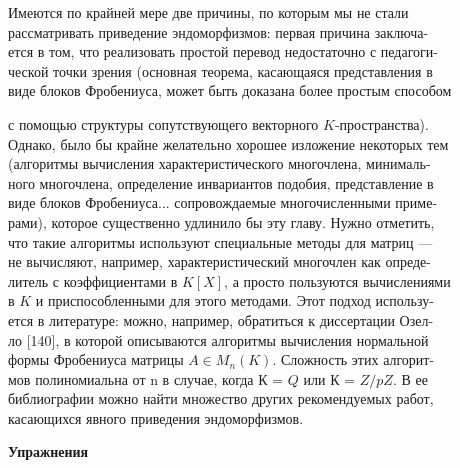 \medskip

Имеются по крайней мере две причины, по которым мы не стали\\ 
рассматривать приведение эндоморфизмов: первая причина 
заключа-\\ется в том, что реализовать простой перевод недостаточно с 
педагоги-\\ческой точки зрения (основная теорема, касающаяся представления в\\ виде блоков Фробениуса, может быть доказана более простым способом

\pagebreak

\noindent с помощью структуры сопутствующего векторного $K$-пространства).\\ 
Однако, было бы крайне желательно хорошее изложение некоторых тем\\ 
(алгоритмы вычисления характеристического многочлена, 
минималь-\\ного многочлена, определение инвариантов подобия, представление в\\ виде блоков Фробениуса... сопровождаемые многочисленными 
приме-\\рами), которое существенно удлинило бы эту главу. Нужно отметить,\\ 
что такие алгоритмы используют специальные методы для матриц —\\ 
не вычисляют, например, характеристический многочлен как 
опреде-\\литель с коэффициентами в $K[X]$, а просто пользуются вычислениями\\ 
в $K$ и приспособленными для этого методами. Этот подход 
использу-\\ется в литературе: можно, например, обратиться к диссертации Озел-\\ ло [140], в которой описываются алгоритмы вычисления нормальной\\ 
формы Фробениуса матрицы $A \in M_n(K)$. Сложность этих 
алгорит-\\мов полиномиальна от n в случае, когда $К$ = $Q$ или $К$ = $Z/pZ$. В ее \\
библиографии можно найти множество других рекомендуемых работ,\\ 
касающихся явного приведения эндоморфизмов.

\pagebreak

\cleartop
\rule{0pt}{10pt}

\begin{center}

{\large\bf Упражнения}
\end{center}

